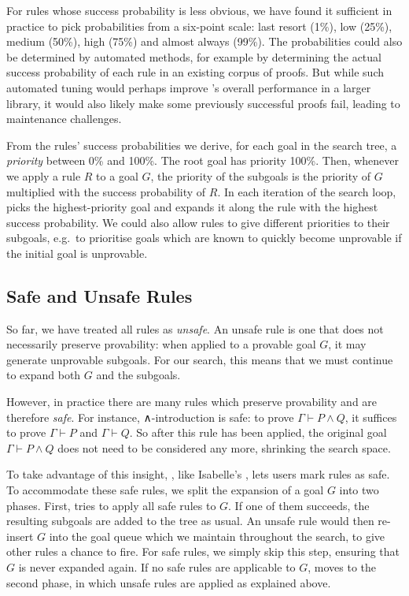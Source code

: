 For rules whose success probability is less obvious, we have found it sufficient
in practice to pick probabilities from a six-point scale: last resort (1\%), low
(25\%), medium (50\%), high (75\%) and almost always (99\%). The probabilities
could also be determined by automated methods, for example by determining the
actual success probability of each rule in an existing corpus of proofs. But
while such automated tuning would perhaps improve \Aesop's overall performance
in a larger library, it would also likely make some previously successful proofs
fail, leading to maintenance challenges.

From the rules' success probabilities we derive, for each goal in the search
tree, a \emph{priority} between 0\% and 100\%. The root goal has priority 100\%.
Then, whenever we apply a rule $R$ to a goal $G$, the priority of the subgoals
is the priority of $G$ multiplied with the success probability of $R$. In each
iteration of the search loop, \Aesop{} picks the highest-priority goal and
expands it along the rule with the highest success probability. We could also
allow rules to give different priorities to their subgoals, e.g.\ to prioritise
goals which are known to quickly become unprovable if the initial goal is
unprovable.

\subsection{Safe and Unsafe Rules}%
\label{sec:safe}

So far, we have treated all rules as \emph{unsafe}. An unsafe rule is one that
does not necessarily preserve provability: when applied to a provable goal $G$,
it may generate unprovable subgoals. For our search, this means that we must
continue to expand both $G$ and the subgoals.

However, in practice there are many rules which preserve provability and are
therefore \emph{safe}. For instance, ∧-introduction is safe: to prove
$Γ ⊢ P ∧ Q$, it suffices to prove $Γ ⊢ P$ and $Γ ⊢ Q$. So after
this rule has been applied, the original goal $Γ ⊢ P ∧ Q$ does not need to
be considered any more, shrinking the search space.

To take advantage of this insight, \Aesop{}, like Isabelle's \auto, lets users
mark rules as safe. To accommodate these safe rules, we split the expansion of a
goal $G$ into two phases. First, \Aesop{} tries to apply all safe rules to $G$.
If one of them succeeds, the resulting subgoals are added to the tree as usual.
An unsafe rule would then re-insert $G$ into the goal queue which we maintain
throughout the search, to give other rules a chance to fire. For safe rules, we
simply skip this step, ensuring that $G$ is never expanded again. If no safe
rules are applicable to $G$, \Aesop{} moves to the second phase, in which unsafe
rules are applied as explained above.

